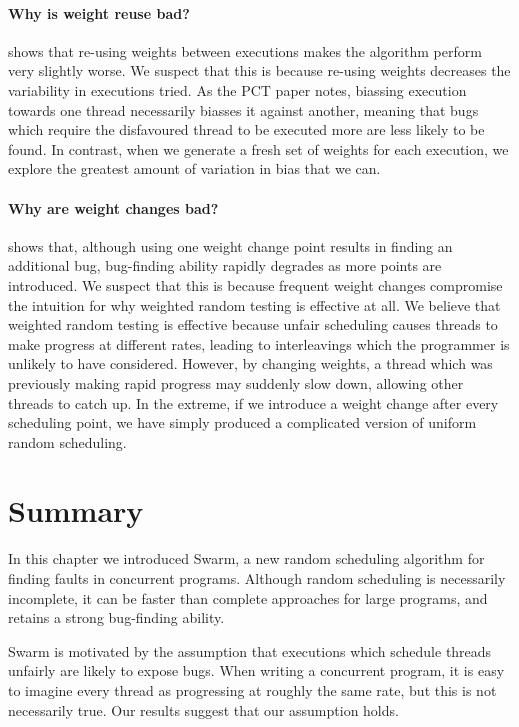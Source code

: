 \paragraph{Why is weight reuse bad?}
 shows that re-using weights between executions
makes the algorithm perform very slightly worse.  We suspect that this
is because re-using weights decreases the variability in executions
tried.  As the PCT paper notes, biassing execution towards one thread
necessarily biasses it against another, meaning that bugs which
require the disfavoured thread to be executed more are less likely to
be found\cite{burckhardt2010}.  In contrast, when we generate a fresh
set of weights for each execution, we explore the greatest amount of
variation in bias that we can.

\paragraph{Why are weight changes bad?}
 shows that, although using one weight change
point results in finding an additional bug, bug-finding ability
rapidly degrades as more points are introduced.  We suspect that this
is because frequent weight changes compromise the intuition for why
weighted random testing is effective at all.  We believe that weighted
random testing is effective because unfair scheduling causes threads
to make progress at different rates, leading to interleavings which
the programmer is unlikely to have considered.  However, by changing
weights, a thread which was previously making rapid progress may
suddenly slow down, allowing other threads to catch up.  In the
extreme, if we introduce a weight change after every scheduling point,
we have simply produced a complicated version of uniform random
scheduling.

\pagebreak

\section{Summary}

In this chapter we introduced Swarm, a new random scheduling algorithm
for finding faults in concurrent programs.  Although random scheduling
is necessarily incomplete, it can be faster than complete approaches
for large programs, and retains a strong bug-finding ability.

Swarm is motivated by the assumption that executions which schedule
threads unfairly are likely to expose bugs.  When writing a concurrent
program, it is easy to imagine every thread as progressing at roughly
the same rate, but this is not necessarily true.  Our results suggest
that our assumption holds.

